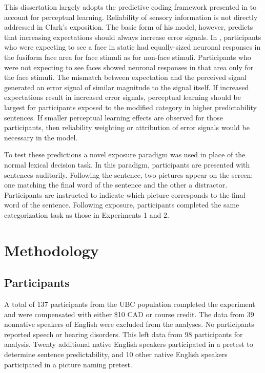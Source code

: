 This dissertation largely adopts the predictive coding framework presented in \citet{Clark2013} to account for perceptual learning.
Reliability of sensory information is not directly addressed in Clark's exposition.
The basic form of his model, however, predicts that increasing expectations should always increase error signals.
In \citet[cited in \citet{Clark2013}]{Egner2010}, participants who were expecting to see a face in static had equally-sized neuronal responses in the fusiform face area for face stimuli as for non-face stimuli.  
Participants who were not expecting to see faces showed neuronal responses in that area only for the face stimuli.
The mismatch between expectation and the perceived signal generated an error signal of similar magnitude to the signal itself.
If increased expectations result in increased error signals, perceptual learning should be largest for participants exposed to the modified category in higher predictability sentences.
If smaller perceptual learning effects are observed for those participants, then reliability weighting or attribution of error signals would be necessary in the model.

To test these predictions a novel exposure paradigm was used in place of the normal lexical decision task.  
In this paradigm, participants are presented with sentences auditorily.  
Following the sentence, two pictures appear on the screen: one matching the final word of the sentence and the other a distractor. 
Participants are instructed to indicate which picture corresponds to the final word of the sentence.
Following exposure, participants completed the same categorization task as those in Experiments 1 and 2.

\section{Methodology}

\subsection{Participants}

A total of 137 participants from the UBC population completed the experiment and were compensated with either \$10 CAD or course credit.  
The data from 39 nonnative speakers of English were excluded from the analyses.
No participants reported speech or hearing disorders.
This left data from 98 participants for analysis.
Twenty additional native English speakers participated in a pretest to determine sentence predictability, and 10 other native English speakers participated in a picture naming pretest.

